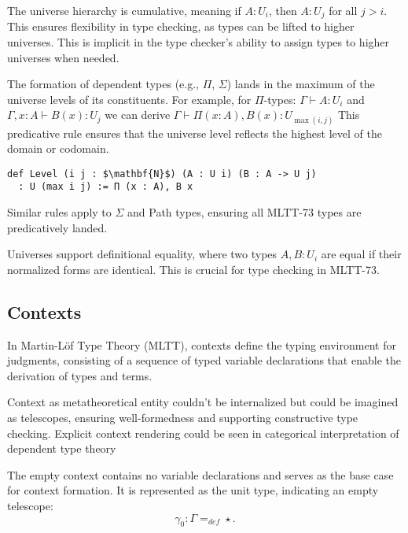 \documentclass{article}
\begin{document}
\begin{definition}
The universe hierarchy is cumulative, meaning
if \( A : U_i \), then \( A : U_j \) for all \( j > i \).
This ensures flexibility in type checking, as types can be lifted to higher universes.
This is implicit in the type checker’s ability
to assign types to higher universes when needed.
\end{definition}

\begin{definition}
The formation of dependent types (e.g., \( \Pi \), \( \Sigma \)) lands
in the maximum of the universe levels of its constituents. For example,
for \( \Pi \)-types: $\Gamma \vdash A : U_i$ and $\Gamma, x : A \vdash B(x) : U_j$ we
can derive $\Gamma \vdash \Pi (x : A), B(x) : U_{\max(i, j)}$
This predicative rule ensures that the universe level reflects
the highest level of the domain or codomain.
\begin{lstlisting}[mathescape=true]
def Level (i j : $\mathbf{N}$) (A : U i) (B : A -> U j)
  : U (max i j) := Π (x : A), B x
\end{lstlisting}
Similar rules apply to \( \Sigma \) and Path types,
ensuring all MLTT-73 types are predicatively landed.
\end{definition}

\begin{definition}
Universes support definitional equality, where two types \( A, B : U_i \)
are equal if their normalized forms are identical.
This is crucial for type checking in MLTT-73.
\end{definition}

\subsection*{Contexts}
In Martin-Löf Type Theory (MLTT), contexts define the typing
environment for judgments, consisting of a sequence of typed
variable declarations that enable the derivation of types and
terms.

Context as metatheoretical entity couldn't be internalized but could be
imagined as telescopes, ensuring well-formedness and supporting
constructive type checking. Explicit context rendering could be
seen in categorical interpretation of dependent type theory

\begin{definition}
The empty context contains no variable declarations and serves as the base case for context formation.
It is represented as the unit type, indicating an empty telescope:
\[
\gamma_0 : \Gamma =_{def} \star.
\]
\end{definition}
\end{document}
